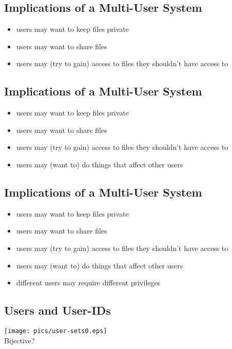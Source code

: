 \documentclass[xga]{xdvislides}
\begin{document}
\subsection{Implications of a Multi-User System}
\begin{itemize}
	\item users may want to keep files private
	\item users may want to share files
	\item users may (try to gain) access to files they shouldn't have access to
\end{itemize}

\subsection{Implications of a Multi-User System}
\begin{itemize}
	\item users may want to keep files private
	\item users may want to share files
	\item users may (try to gain) access to files they shouldn't have access to
	\item users may (want to) do things that affect other users
\end{itemize}

\subsection{Implications of a Multi-User System}
\begin{itemize}
	\item users may want to keep files private
	\item users may want to share files
	\item users may (try to gain) access to files they shouldn't have access to
	\item users may (want to) do things that affect other users
	\item different users may require different privileges
\end{itemize}

\subsection{Users and User-IDs}
\begin{center}
	\texttt{[image: pics/user-sets0.eps]} \\
	Bijective?
\end{center}
\end{document}
